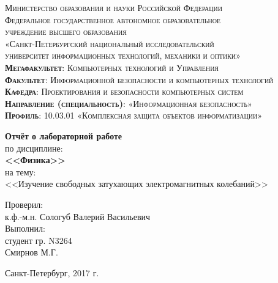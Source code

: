 \begin{titlepage}
	\begin{center}
		\textsc{
			\fontsize{12pt}{14pt}\selectfont
			Министерство образования и науки Российской Федерации\\
			Федеральное государственное автономное образовательное\\
			учреждение высшего образования\\
			«Санкт-Петербургский национальный исследовательский\\
			университет информационных технологий, механики и оптики»\\
			\textbf{Мегафакультет}:  Компьютерных технологий и Управления\\
			\textbf{Факультет}: Информационной безопасности и компьютерных технологий\\
			\textbf{Кафедра}: Проектирования и безопасности компьютерных систем\\
			\textbf{Направление (специальность)}: «Информационная безопасность»\\
			\textbf{Профиль}: 10.03.01 «Комплексная защита объектов информатизации»}

		\vfill

		\textbf{Отчёт о лабораторной работе}\\
		по дисциплине:\\
		\textbf{<<Физика>>}\\
		на тему:\\
		<<Изучение свободных затухающих электромагнитных колебаний>>\\
	\end{center}

	\hfill
	\begin{flushright}
		Проверил:\\[2mm] 
		к.ф.-м.н. Сологуб Валерий Васильевич\\[2mm] 

		Выполнил:\\
		студент гр.  N3264\\
		Смирнов М.Г.\\[2mm]

	\end{flushright}%
	\vfill
	\begin{center}
		Санкт-Петербург, 2017 г.
	\end{center}
\end{titlepage}

